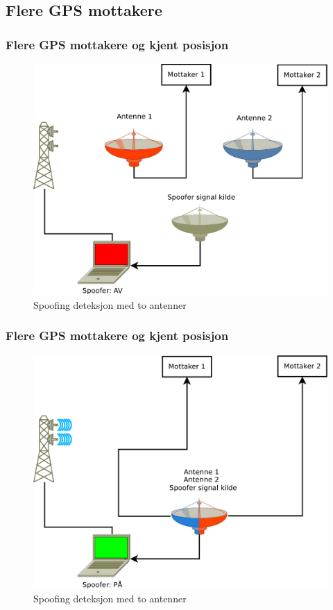 \documentclass[xcolor=table]{beamer}
\begin{document}
\subsection{Flere GPS mottakere}
\begin{frame} 
  \frametitle{Flere GPS mottakere og kjent posisjon}
  \begin{figure}
    \includegraphics[scale=0.23]{thesis/graphics/toantenner.pdf}
    \caption{Spoofing deteksjon med to antenner}
  \end{figure}
\end{frame}

\begin{frame} 
  \frametitle{Flere GPS mottakere og kjent posisjon}
  \begin{figure}
    \includegraphics[scale=0.23]{thesis/graphics/toantenner_2.pdf}
    \caption{Spoofing deteksjon med to antenner}
  \end{figure}
\end{frame}
\end{document}
